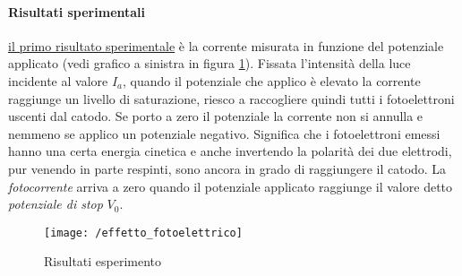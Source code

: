 \paragraph{Risultati sperimentali}
\underline{il primo risultato sperimentale} è la corrente misurata in funzione del potenziale applicato (vedi grafico a sinistra in figura \ref{risultati_Lenard}).
Fissata l'intensità della luce incidente al valore $I_a$, quando il potenziale che applico è elevato la corrente raggiunge un livello di saturazione, riesco a raccogliere quindi tutti i fotoelettroni uscenti dal catodo.
Se porto a zero il potenziale la corrente non si annulla e nemmeno se applico un potenziale negativo. 
Significa che i fotoelettroni emessi hanno una certa energia cinetica e anche invertendo la polarità dei due elettrodi, pur venendo in parte respinti, sono ancora in grado di raggiungere il catodo.
La \textit{fotocorrente} arriva a zero quando il potenziale applicato raggiunge il valore detto \textit{potenziale di stop} $V_0$.
\begin{figure}[h]
\centering
\texttt{[image: /effetto\_fotoelettrico]}
\caption{Risultati esperimento}
\label{risultati_Lenard}
\end{figure}

